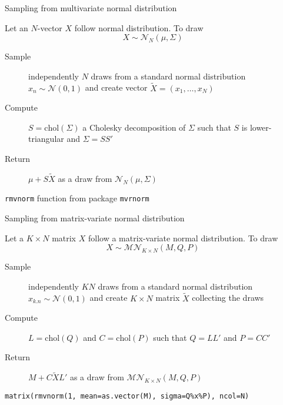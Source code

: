 \documentclass[notes,blackandwhite,mathsans,usenames,dvipsnames]{beamer}
\begin{document}
\begin{frame}{Sampling from multivariate normal distribution}

{\color{mcxs2}Let an} $N${\color{mcxs2}-vector} $X$ {\color{mcxs2}follow normal distribution. To draw }
$$ X\sim\mathcal{N}_N(\mu,\Sigma) $$

\begin{description}
\item[Sample] {\color{mcxs2}independently} $N$ {\color{mcxs2}draws from a standard normal distribution}
$x_n\sim\mathcal{N}(0,1)$ {\color{mcxs2}and create vector} $\tilde{X} = (x_1, \dots, x_N)$
\bigskip\item[Compute] $S=\text{chol}(\Sigma)$ {\color{mcxs2}a Cholesky decomposition of} $\Sigma$ {\color{mcxs2}such that} $S$ {\color{mcxs2}is lower-triangular and} $\Sigma = SS'$
\bigskip\item[Return] $\mu + S\tilde{X}$ {\color{mcxs2}as a draw from} $\mathcal{N}_N(\mu,\Sigma)$
\end{description}

 \texttt{rmvnorm} {\color{mcxs2}function from package} \texttt{mvrnorm}

\end{frame}



\begin{frame}{Sampling from matrix-variate normal distribution}

{\color{mcxs2}Let a} $K\times N$ {\color{mcxs2}matrix} $X$ {\color{mcxs2}follow a matrix-variate normal distribution. To draw} 
$$ X\sim\mathcal{MN}_{K\times N}(M,Q,P) $$

\begin{description}
\item[Sample] {\color{mcxs2}independently} $KN$ {\color{mcxs2}draws from a standard normal distribution}
$x_{k.n}\sim\mathcal{N}(0,1)$ {\color{mcxs2}and create} $K\times N$ {\color{mcxs2}matrix} $\tilde{X}$ {\color{mcxs2}collecting the draws}
\bigskip\item[Compute] $L=\text{chol}(Q)$ {\color{mcxs2}and} $C=\text{chol}(P)$ {\color{mcxs2}such that}  $Q = LL'$ {\color{mcxs2}and} $P = CC'$
\bigskip\item[Return] $M + C\tilde{X}L'$ {\color{mcxs2}as a draw from} $\mathcal{MN}_{K\times N}(M,Q,P)$
\end{description}

 \footnotesize
\texttt{matrix(rmvnorm(1, mean=as.vector(M), sigma=Q\%x\%P), ncol=N)}

\end{frame}
\end{document}
